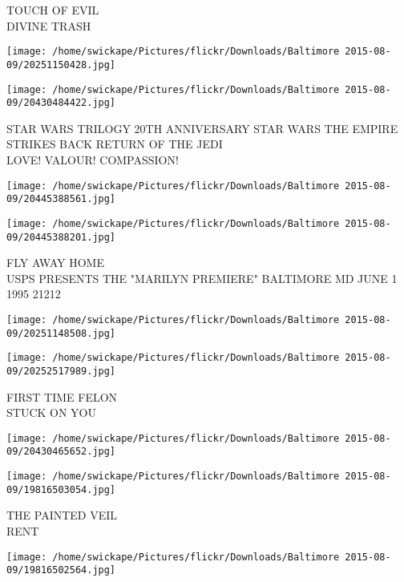 \documentclass[10pt,letterpaper]{article}
\begin{document}
TOUCH OF EVIL\\
DIVINE TRASH\\
\pagebreak

\texttt{[image: /home/swickape/Pictures/flickr/Downloads/Baltimore 2015-08-09/20251150428.jpg]}

\vspace{0.25in}
\texttt{[image: /home/swickape/Pictures/flickr/Downloads/Baltimore 2015-08-09/20430484422.jpg]}

STAR WARS TRILOGY 20TH ANNIVERSARY STAR WARS THE EMPIRE STRIKES BACK RETURN OF THE JEDI\\
LOVE!  VALOUR!  COMPASSION!\\
\pagebreak

\texttt{[image: /home/swickape/Pictures/flickr/Downloads/Baltimore 2015-08-09/20445388561.jpg]}

\vspace{0.25in}
\texttt{[image: /home/swickape/Pictures/flickr/Downloads/Baltimore 2015-08-09/20445388201.jpg]}

FLY AWAY HOME\\
USPS PRESENTS THE "MARILYN PREMIERE" BALTIMORE MD JUNE 1 1995 21212\\
\pagebreak

\texttt{[image: /home/swickape/Pictures/flickr/Downloads/Baltimore 2015-08-09/20251148508.jpg]}

\vspace{0.25in}
\texttt{[image: /home/swickape/Pictures/flickr/Downloads/Baltimore 2015-08-09/20252517989.jpg]}

FIRST TIME FELON\\
STUCK ON YOU\\
\pagebreak

\texttt{[image: /home/swickape/Pictures/flickr/Downloads/Baltimore 2015-08-09/20430465652.jpg]}

\vspace{0.25in}
\texttt{[image: /home/swickape/Pictures/flickr/Downloads/Baltimore 2015-08-09/19816503054.jpg]}

THE PAINTED VEIL\\
RENT\\
\pagebreak

\texttt{[image: /home/swickape/Pictures/flickr/Downloads/Baltimore 2015-08-09/19816502564.jpg]}
\end{document}
